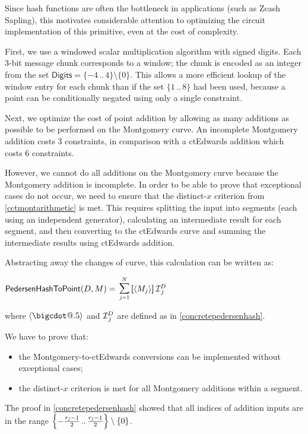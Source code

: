 \documentclass{article}
\makeatletter
\newcommand*\bigcdot{\mathpalette\bigcdot@{.5}}
\newcommand*\bigcdot@[2]{\mathbin{\vcenter{\hbox{\scalebox{#2}{$\m@th#1\bullet$}}}}}
\newcommand{\crossref}[1]{\autoref{#1}}
\newcommand{\setof}[1]{\{{#1}\}}
\newcommand{\bigsetof}[1]{\left\{{#1}\right\}}
\newcommand{\barerange}[2]{{{#1}\,..\,{#2}}}
\newcommand{\range}[2]{\setof{\barerange{#1}{#2}}}
\newcommand{\bigrange}[2]{\bigsetof{\barerange{#1}{#2}}}
\newcommand{\rangenozero}[2]{\range{#1}{#2} \setminus \setof{0}}
\newcommand{\bigrangenozero}[2]{\bigrange{#1}{#2} \setminus \setof{0}}
\newcommand{\vop}[3]{\,\raisebox{0.29ex}{\scalebox{0.89}{$\smashoperator[r]{#3_{#1}^{#2}}$\,}}}
\newcommand{\vsum}[2]{\vop{#1}{#2}{\sum}}
\newcommand{\scalarmult}[2]{\boldsymbol{[}{#1}\boldsymbol{]}\,{#2}}
\newcommand{\paramdot}{\bigcdot}
\newcommand{\ParamJ}[1]{{{#1}_\mathbb{\hskip 0.01em J}}}
\newcommand{\PedersenGenAlg}{\mathcal{I}}
\newcommand{\PedersenGen}[2]{\PedersenGenAlg^{\kern -0.05em{#1}}_{\kern 0.1em {#2}}}
\newcommand{\PedersenEncode}[1]{\langle{#1}\rangle}
\newcommand{\PedersenHashToPoint}{\mathsf{PedersenHashToPoint}}
\newcommand{\Digits}{\mathsf{Digits}}
\makeatother
\begin{document}
Since hash functions are often the bottleneck in applications (such as
Zcash Sapling), this motivates considerable attention to optimizing the
circuit implementation of this primitive, even at the cost of complexity.

First, we use a windowed scalar multiplication algorithm with signed digits.
Each $3$-bit message chunk corresponds to a window; the chunk is encoded
as an integer from the set $\Digits = \rangenozero{-4}{4}$.
This allows a more efficient lookup of the window entry for each chunk than
if the set $\range{1}{8}$ had been used, because a point can be conditionally
negated using only a single constraint.

Next, we optimize the cost of point addition by allowing as many additions
as possible to be performed on the Montgomery curve. An incomplete
Montgomery addition costs $3$ constraints, in comparison with a
ctEdwards addition which costs $6$ constraints.

However, we cannot do all additions on the Montgomery curve because the
Montgomery addition is incomplete. In order to be able to prove that
exceptional cases do not occur, we need to ensure that the distinct-$x$ criterion
from \crossref{cctmontarithmetic} is met. This requires splitting the
input into segments (each using an independent generator), calculating
an intermediate result for each segment, and then converting to the
ctEdwards curve and summing the intermediate results using
ctEdwards addition.

Abstracting away the changes of curve, this calculation can be written as:

\begin{formulae}
  \item $\PedersenHashToPoint(D, M) = \vsum{j=1}{N} \scalarmult{\PedersenEncode{M_j}}{\PedersenGen{D}{j}}$
\end{formulae}
\vspace{-2ex}
where $\PedersenEncode{\paramdot}$ and $\PedersenGen{D}{j}$
are defined as in \crossref{concretepedersenhash}.

We have to prove that:
\begin{itemize}
  \item the Montgomery-to-ctEdwards conversions can be implemented without
        exceptional cases;
  \item the distinct-$x$ criterion is met for all Montgomery additions within
        a segment.
\end{itemize}

The proof in \crossref{concretepedersenhash} showed that
all indices of addition inputs are in the range
$\bigrangenozero{-\frac{\ParamJ{r}-1}{2}}{\frac{\ParamJ{r}-1}{2}}$.
\end{document}
